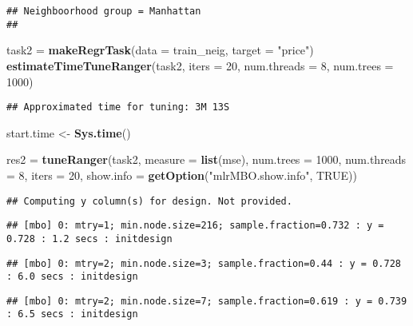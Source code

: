 \documentclass[
]{article}
\newenvironment{Shaded}{\begin{snugshade}}{\end{snugshade}}
\newcommand{\DataTypeTok}[1]{\textcolor[rgb]{0.13,0.29,0.53}{#1}}
\newcommand{\DecValTok}[1]{\textcolor[rgb]{0.00,0.00,0.81}{#1}}
\newcommand{\KeywordTok}[1]{\textcolor[rgb]{0.13,0.29,0.53}{\textbf{#1}}}
\newcommand{\NormalTok}[1]{#1}
\newcommand{\OtherTok}[1]{\textcolor[rgb]{0.56,0.35,0.01}{#1}}
\newcommand{\StringTok}[1]{\textcolor[rgb]{0.31,0.60,0.02}{#1}}
\begin{document}
\begin{verbatim}
## Neighboorhood group = Manhattan
## 
\end{verbatim}

\begin{Shaded}
\begin{Highlighting}[]
\NormalTok{task2 =}\StringTok{ }\KeywordTok{makeRegrTask}\NormalTok{(}\DataTypeTok{data =}\NormalTok{ train_neig, }\DataTypeTok{target =} \StringTok{"price"}\NormalTok{)}
\KeywordTok{estimateTimeTuneRanger}\NormalTok{(task2, }\DataTypeTok{iters =} \DecValTok{20}\NormalTok{, }\DataTypeTok{num.threads =} \DecValTok{8}\NormalTok{, }\DataTypeTok{num.trees =} \DecValTok{1000}\NormalTok{)}
\end{Highlighting}
\end{Shaded}

\begin{verbatim}
## Approximated time for tuning: 3M 13S
\end{verbatim}

\begin{Shaded}
\begin{Highlighting}[]
\NormalTok{start.time <-}\StringTok{ }\KeywordTok{Sys.time}\NormalTok{()}

     
\NormalTok{res2 =}\StringTok{ }\KeywordTok{tuneRanger}\NormalTok{(task2, }\DataTypeTok{measure =} \KeywordTok{list}\NormalTok{(mse), }\DataTypeTok{num.trees =} \DecValTok{1000}\NormalTok{, }
                 \DataTypeTok{num.threads =} \DecValTok{8}\NormalTok{, }\DataTypeTok{iters =} \DecValTok{20}\NormalTok{,  }\DataTypeTok{show.info =} \KeywordTok{getOption}\NormalTok{(}\StringTok{"mlrMBO.show.info"}\NormalTok{, }\OtherTok{TRUE}\NormalTok{))}
\end{Highlighting}
\end{Shaded}

\begin{verbatim}
## Computing y column(s) for design. Not provided.
\end{verbatim}

\begin{verbatim}
## [mbo] 0: mtry=1; min.node.size=216; sample.fraction=0.732 : y = 0.728 : 1.2 secs : initdesign
\end{verbatim}

\begin{verbatim}
## [mbo] 0: mtry=2; min.node.size=3; sample.fraction=0.44 : y = 0.728 : 6.0 secs : initdesign
\end{verbatim}

\begin{verbatim}
## [mbo] 0: mtry=2; min.node.size=7; sample.fraction=0.619 : y = 0.739 : 6.5 secs : initdesign
\end{verbatim}
\end{document}
